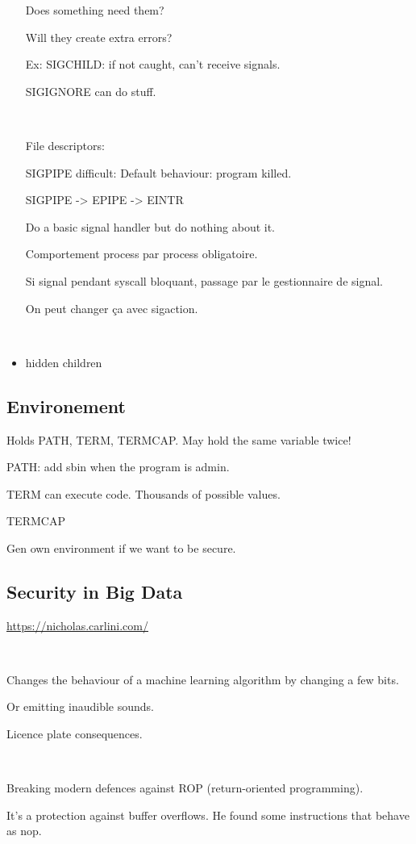 \documentclass[a4paper,11pt]{article}
\begin{document}
\begin{itemize}
  Does something need them?

  Will they create extra errors?

  Ex: SIGCHILD: if not caught, can't receive signals.

  SIGIGNORE can do stuff.

  \

  File descriptors:

  SIGPIPE difficult: Default behaviour: program killed.

  SIGPIPE -> EPIPE -> EINTR

  Do a basic signal handler but do nothing about it.

  Comportement process par process obligatoire.

  Si signal pendant syscall bloquant, passage par le gestionnaire de signal.

  On peut changer ça avec sigaction.

  \

\item hidden children
\end{itemize}

\subsection{Environement}

Holds PATH, TERM, TERMCAP. May hold the same variable twice!

PATH: add sbin when the program is admin.

TERM can execute code. Thousands of possible values.

TERMCAP

Gen own environment if we want to be secure.

\subsection{Security in Big Data}

\url{https://nicholas.carlini.com/}

\

Changes the behaviour of a machine learning algorithm by changing a few bits.

Or emitting inaudible sounds.

Licence plate consequences.

\

Breaking modern defences against ROP (return-oriented programming).

It's a protection against buffer overflows. He found some instructions that
behave as nop.
\end{document}
